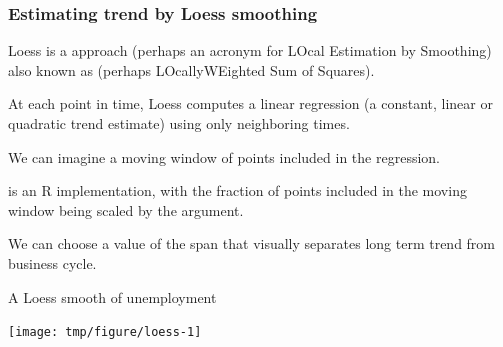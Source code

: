 \begin{frame}[fragile]

\frametitle{Estimating trend by Loess smoothing}

\bi

\item Loess is a  approach (perhaps an acronym for LOcal Estimation by Smoothing) also known as  (perhaps LOcallyWEighted Sum of Squares). 

\item At each point in time, Loess computes a linear regression (a constant, linear or quadratic trend estimate) using only neighboring times. 

\item We can imagine a moving window of points included in the regression.

\item {} is an R implementation, with the fraction of points included in the moving window being scaled by the  argument. 

\item We can choose a value of the span that visually separates long term trend from business cycle.

\ei

\end{frame}

\begin{frame}[fragile]{A Loess smooth of unemployment}

\begin{knitrout}\small
{}\color{fgcolor}\begin{kframe}
\begin{alltt}
 \hlkwb{<-} \hlopt{~}\hlstd{=}\hlstd{)}
\hlstd{=}\hlstd{,}\hlstd{=}\hlstd{)}
\hlopt{$}\hlopt{$}\hlstd{=}\hlstd{)}
\end{alltt}
\end{kframe}
\end{knitrout}

\begin{knitrout}\small
{}\color{fgcolor}

{\centering \texttt{[image: tmp/figure/loess-1]} 

}


\end{knitrout}
\end{frame}

